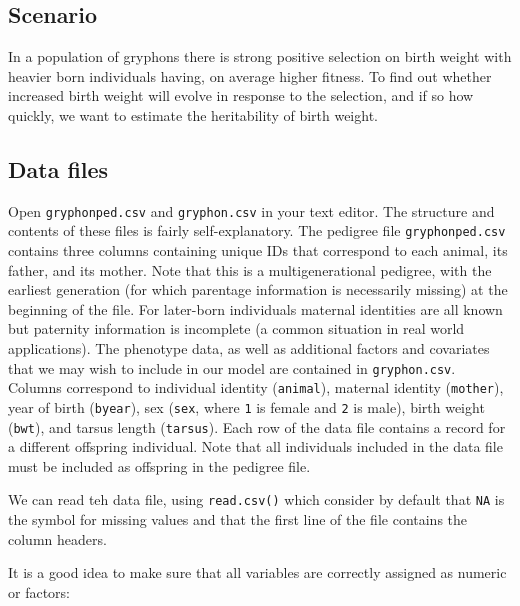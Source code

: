 \documentclass[
  12pt,
]{book}
\begin{document}
\hypertarget{scenario}{%
\subsection{Scenario}\label{scenario}}

In a population of gryphons there is strong positive selection on birth weight with heavier born individuals having, on average higher fitness. To find out whether increased birth weight will evolve in response to the selection, and if so how quickly, we want to estimate the heritability of birth weight.

\hypertarget{data-files-1}{%
\subsection{Data files}\label{data-files-1}}

Open \texttt{gryphonped.csv} and \texttt{gryphon.csv} in your text editor. The structure and contents of these files is fairly self-explanatory. The pedigree file \texttt{gryphonped.csv} contains three columns containing unique IDs that correspond to each animal, its father, and its mother. Note that this is a multigenerational pedigree, with the earliest generation (for which parentage information is necessarily missing) at the beginning of the file. For later-born individuals maternal identities are all known but paternity information is incomplete (a common situation in real world applications).
The phenotype data, as well as additional factors and covariates that we may wish to include in our model are contained in \texttt{gryphon.csv}. Columns correspond to individual identity (\texttt{animal}), maternal identity (\texttt{mother}), year of birth (\texttt{byear}), sex (\texttt{sex}, where \texttt{1} is female and \texttt{2} is male), birth weight (\texttt{bwt}), and tarsus length (\texttt{tarsus}). Each row of the data file contains a record for a different offspring individual. Note that all individuals included in the data file must be included as offspring in the pedigree file.

We can read teh data file, using \texttt{read.csv()} which consider by default that \texttt{NA} is the symbol for missing values and that the first line of the file contains the column headers.

It is a good idea to make sure that all variables are correctly assigned as numeric or factors:
\end{document}
